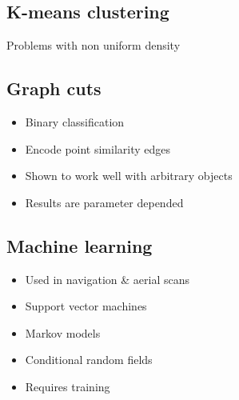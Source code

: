 	\subsection{K-means clustering}
		Problems with non uniform density

	\subsection{Graph cuts}
		\begin{itemize}
		\item Binary classification
		\item Encode point similarity edges
		\item Shown to work well with arbitrary objects
		\item Results are parameter depended
		\end{itemize}

	\subsection{Machine learning}
		\begin{itemize}
		\item Used in navigation \& aerial scans
		\item Support vector machines
		\item Markov models
		\item Conditional random fields
		\item Requires training
		\end{itemize}
		

